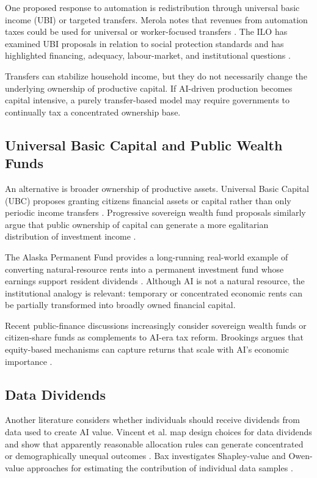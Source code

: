 \documentclass[conference]{IEEEtran}
\begin{document}
One proposed response to automation is redistribution through universal basic
income (UBI) or targeted transfers. Merola notes that revenues from automation
taxes could be used for universal or worker-focused transfers
\cite{Merola2022}. The ILO has examined UBI proposals in relation to social
protection standards and has highlighted financing, adequacy, labour-market,
and institutional questions \cite{ILOUBI}.

Transfers can stabilize household income, but they do not necessarily change
the underlying ownership of productive capital. If AI-driven production becomes
capital intensive, a purely transfer-based model may require governments to
continually tax a concentrated ownership base.

\subsection{Universal Basic Capital and Public Wealth Funds}

An alternative is broader ownership of productive assets. Universal Basic
Capital (UBC) proposes granting citizens financial assets or capital rather than
only periodic income transfers \cite{LeGrand2020}. Progressive sovereign wealth
fund proposals similarly argue that public ownership of capital can generate a
more egalitarian distribution of investment income \cite{Corneo2022}.

The Alaska Permanent Fund provides a long-running real-world example of
converting natural-resource rents into a permanent investment fund whose
earnings support resident dividends \cite{APF}. Although AI is not a natural
resource, the institutional analogy is relevant: temporary or concentrated
economic rents can be partially transformed into broadly owned financial
capital.

Recent public-finance discussions increasingly consider sovereign wealth funds
or citizen-share funds as complements to AI-era tax reform. Brookings argues
that equity-based mechanisms can capture returns that scale with AI's economic
importance \cite{BrookingsTax2026,BrookingsFairness2026}.

\subsection{Data Dividends}

Another literature considers whether individuals should receive dividends from
data used to create AI value. Vincent et al. map design choices for data
dividends and show that apparently reasonable allocation rules can generate
concentrated or demographically unequal outcomes \cite{Vincent2019}. Bax
investigates Shapley-value and Owen-value approaches for estimating the
contribution of individual data samples \cite{Bax2019}.
\end{document}
